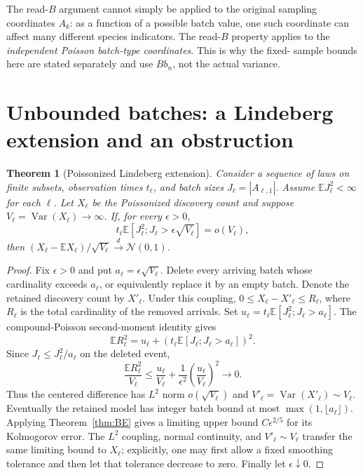 \documentclass[11pt]{article}
\numberwithin{equation}{section}
\newtheorem{theorem}{Theorem}[section]
\theoremstyle{definition}
\theoremstyle{remark}
\newcommand{\E}{\mathbb E}
\newcommand{\Var}{\operatorname{Var}}
\newcommand{\Normal}{\mathcal N(0,1)}
\newcommand{\dto}{\xrightarrow{\ d\ }}
\begin{document}
The read-$B$ argument cannot simply be applied to the original sampling
coordinates $A_k$: as a function of a possible batch value, one such coordinate
can affect many different species indicators. The read-$B$ property applies to
the \emph{independent Poisson batch-type coordinates}. This is why the fixed-
sample bounds here are stated separately and use $Bb_n$, not the actual variance.

\section{Unbounded batches: a Lindeberg extension and an obstruction}\label{sec:unbounded}

\begin{theorem}[Poissonized Lindeberg extension]\label{thm:unbounded}
Consider a sequence of laws on finite subsets, observation times $t_\ell$,
and batch sizes $J_\ell=|A_{\ell,1}|$. Assume $\E J_\ell^2<\infty$ for each
$\ell$. Let $X_\ell$ be the Poissonized discovery count and suppose
$V_\ell=\Var(X_\ell)\to\infty$. If, for every $\epsilon>0$,
\begin{equation}\label{eq:batchlindeberg}
 t_\ell\E[J_\ell^2;J_\ell>\epsilon\sqrt{V_\ell}]=o(V_\ell),
\end{equation}
then $(X_\ell-\E X_\ell)/\sqrt{V_\ell}\dto\Normal$.
\end{theorem}
\begin{proof}
Fix $\epsilon>0$ and put $a_\ell=\epsilon\sqrt{V_\ell}$. Delete every
arriving batch whose cardinality exceeds $a_\ell$, or equivalently replace
it by an empty batch. Denote the retained discovery count by $X'_\ell$.
Under this coupling, $0\le X_\ell-X'_\ell\le R_\ell$, where $R_\ell$ is
the total cardinality of the removed arrivals. Set
$u_\ell=t_\ell\E[J_\ell^2;J_\ell>a_\ell]$.
The compound-Poisson second-moment identity gives
\[
 \E R_\ell^2=u_\ell+
       (t_\ell\E[J_\ell;J_\ell>a_\ell])^2.
\]
Since $J_\ell\le J_\ell^2/a_\ell$ on the deleted event,
\begin{equation}\label{eq:truncationL2}
 \frac{\E R_\ell^2}{V_\ell}
 \le\frac{u_\ell}{V_\ell}
   +\frac1{\epsilon^2}\left(\frac{u_\ell}{V_\ell}\right)^2\to0.
\end{equation}
Thus the centered difference has $L^2$ norm $o(\sqrt{V_\ell})$ and
$V'_\ell=\Var(X'_\ell)\sim V_\ell$. Eventually the retained model has
integer batch bound at most $\max(1,\lfloor a_\ell\rfloor)$. Applying
Theorem~\ref{thm:BE} gives a limiting upper bound $C\epsilon^{2/5}$ for its
Kolmogorov error. The $L^2$ coupling, normal continuity, and $V'_\ell\sim V_\ell$
transfer the same limiting bound to $X_\ell$; explicitly, one may first allow
a fixed smoothing tolerance and then let that tolerance decrease to zero.
Finally let $\epsilon\downarrow0$.
\end{proof}
\end{document}
